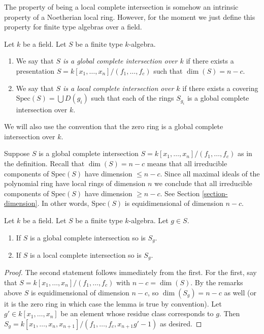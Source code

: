 \noindent
The property of being a local complete intersection is
somehow an intrinsic property of a Noetherian local ring.
However, for the moment we just define this property for
finite type algebras over a field.

\begin{definition}
\label{definition-lci-field}
Let $k$ be a field.
Let $S$ be a finite type $k$-algebra.
\begin{enumerate}
\item We say that {\it $S$ is a global complete intersection over $k$}
if there exists a presentation $S = k[x_1, \ldots, x_n]/(f_1, \ldots, f_c)$
such that $\dim(S) = n - c$.
\item We say that {\it $S$ is a local complete intersection over $k$}
if there exists a covering $\text{Spec}(S) = \bigcup D(g_i)$ such
that each of the rings $S_{g_i}$ is a global complete intersection
over $k$.
\end{enumerate}
We will also use the convention that the zero ring is a global
complete intersection over $k$.
\end{definition}

\noindent
Suppose $S$ is a global complete intersection
$S = k[x_1, \ldots, x_n]/(f_1, \ldots, f_c)$
as in the definition.
Recall that $\dim(S) = n - c$ means that all irreducible
components of $\text{Spec}(S)$ have dimension $\leq n - c$.
Since all maximal ideals of the polynomial ring have local
rings of dimension $n$ we conclude that all irreducible
components of $\text{Spec}(S)$ have dimension $\geq n - c$.
See Section \ref{section-dimension}.
In other words, $\text{Spec}(S)$ is equidimensional
of dimension $n - c$.

\begin{lemma}
\label{lemma-localize-lci}
Let $k$ be a field.
Let $S$ be a finite type $k$-algebra.
Let $g \in S$.
\begin{enumerate}
\item If $S$ is a global complete intersection so is $S_g$.
\item If $S$ is a local complete intersection so is $S_g$.
\end{enumerate}
\end{lemma}

\begin{proof}
The second statement follows immediately from the first.
For the first, say that $S = k[x_1, \ldots, x_n]/(f_1, \ldots, f_c)$
with $n - c = \dim(S)$. By the remarks above $S$ is equidimensional
of dimension $n - c$, so $\dim(S_g) = n - c$ as well (or it is
the zero ring in which case the lemma is true by convention).
Let $g' \in k[x_1, \ldots, x_n]$
be an element whose residue class corresponds to $g$.
Then
$S_g =  k[x_1, \ldots, x_n, x_{n + 1}]/(f_1, \ldots, f_c, x_{n + 1}g' - 1)$
as desired.
\end{proof}

